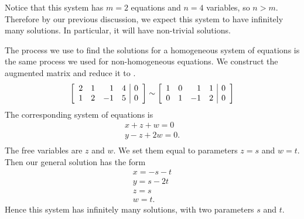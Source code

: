 \begin{solution}
  Notice that this system has $m = 2$ equations and $n = 4$ variables,
  so $n>m$.  Therefore by our previous discussion, we expect this
  system to have infinitely many solutions. In particular, it will
  have non-trivial solutions.

  The process we use to find the solutions for a homogeneous system of
  equations is the same process we used for non-homogeneous
  equations. We construct the augmented matrix and reduce it to
  {\rref}.
  \begin{equation*}
    \left[
    \begin{array}{rrrr|r}
      2 & 1 & 1 & 4 & 0 \\ 
      1 & 2 & -1 & 5 & 0
    \end{array}
    \right]
    \sim
    \left[
    \begin{array}{rrrr|r}
      1 & 0 &  1 & 1 & 0 \\ 
      0 & 1 & -1 & 2 & 0
    \end{array}
    \right]
  \end{equation*}
  The corresponding system of equations is 
  \begin{equation*}
    \begin{array}{r}
      x + z + w = 0 \\
      y - z + 2w = 0. \\
    \end{array}
  \end{equation*}
  The free variables are $z$ and $w$. We set them equal to parameters
  $z=s$ and $w=t$. Then our general solution has the form
  \begin{equation*}
    \begin{array}{c}
      x = -s-t \\
      y = s-2t \\
      z = s \\
      w = t.
    \end{array}
  \end{equation*}
  Hence this system has infinitely many solutions, with two parameters
  $s$ and $t$.
\end{solution}

